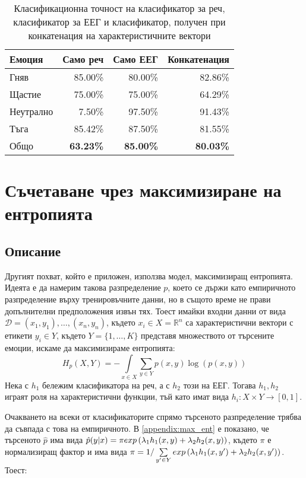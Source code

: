 \documentclass[main.tex]{subfiles}
\begin{document}
\begin{table}[h]
	\begin{center}
		\begin{tabular}{|l|r r r|}
			\hline
			Емоция    & Само реч         & Само ЕЕГ         & Конкатенация     \\
			\hline
			Гняв      & 85.00\%          & 80.00\%          & 82.86\%          \\
			Щастие    & 75.00\%          & 75.00\%          & 64.29\%          \\
			Неутрално & 7.50\%           & 97.50\%          & 91.43\%          \\
			Тъга      & 85.42\%          & 87.50\%          & 81.55\%          \\
			\hline
			\hline
			Общо      & \textbf{63.23\%} & \textbf{85.00\%} & \textbf{80.03\%} \\
			\hline
		\end{tabular}
		\caption{Класификационна точност на класификатор за реч, класификатор за ЕЕГ и класификатор, получен при конкатенация на характеристичните вектори}
		\label{tab:double:results:01}
	\end{center}
\end{table}

\section{Съчетаване чрез максимизиране на ентропията}
\subsection{Описание}
Другият похват, който е приложен, използва модел, максимизиращ ентропията. Идеята е да намерим такова разпределение $p$, което се държи като емпиричното разпределение върху тренировъчните данни, но в същото време не прави допълнителни предположения извън тях.
Тоест имайки входни данни от вида $\mathcal{D} = (x_1, y_1),\ldots, (x_n, y_n)$, където $x_i \in X = \mathbb{R}^n$ са характеристични вектори с етикети $y_i \in Y$, където $Y = \{1,\ldots, K\}$ представя множеството от търсените емоции, искаме да максимизираме ентропията:
\[
	H_p(X, Y) = - \int\limits_{x\in X} \sum\limits_{y \in Y} p(x, y) \log(p(x, y))
\]
Нека с $h_1$ бележим класификатора на реч, а с $h_2$ този на ЕЕГ. Тогава $h_1, h_2$ играят роля на характеристични функции, тъй като имат вида $h_i: X \times Y \to [0, 1]$.

Очакването на всеки от класификаторите спрямо търсеното разпределение трябва да съвпада с това на емпиричното. В \autoref{appendix:max_ent} е показано, че търсеното $\hat{p}$ има вида $\hat{p}(y|x) = \pi exp\left(\lambda_1 h_1(x, y) + \lambda_2 h_2(x, y)\right)$,
където $\pi$ е нормализиращ фактор и има вида $\pi = 1/\sum\limits_{y' \in Y} exp\left(\lambda_1 h_1(x, y') + \lambda_2 h_2(x, y')\right)$. Тоест:
\end{document}
